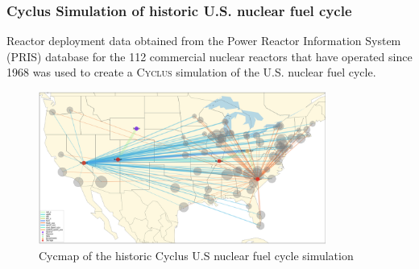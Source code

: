 \begin{frame}
    \frametitle{Cyclus Simulation of historic U.S. nuclear fuel cycle}
        Reactor deployment data obtained from the Power Reactor Information System (PRIS) database \cite{peterson_unf_2017} for the 112 commercial nuclear reactors that have operated since 1968 was used to create a \textsc{Cyclus} simulation of the U.S. nuclear fuel cycle. 

    \begin{figure}[htbp!]
      \begin{center}
        \includegraphics[height=5cm]{../figures/cycmap}
      \end{center}
            \caption{Cycmap of the historic Cyclus U.S nuclear fuel cycle simulation \cite{cycmap_doi}}
      \label{fig:cycmap}
    \end{figure}
  \end{frame}